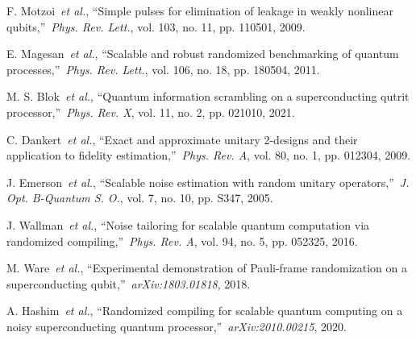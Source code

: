 \documentclass{ieeetran}
\begin{document}
\begin{thebibliography}{00}


 F. Motzoi~\emph{et al.}, ``Simple pulses for elimination of leakage in weakly nonlinear qubits,''~\emph{Phys. Rev. Lett.}, vol. 103, no. 11, pp. 110501, 2009.

 E. Magesan~\emph{et al.}, ``Scalable and robust randomized benchmarking of quantum processes,''~\emph{Phys. Rev. Lett.}, vol. 106, no. 18, pp. 180504, 2011.

 M. S. Blok~\emph{et al.}, ``Quantum information scrambling on a superconducting qutrit processor,''~\emph{Phys. Rev. X}, vol. 11, no. 2, pp. 021010, 2021.

 C. Dankert~\emph{et al.}, ``Exact and approximate unitary 2-designs and their application to fidelity estimation,''~\emph{Phys. Rev. A}, vol. 80, no. 1, pp. 012304, 2009.

 J. Emerson~\emph{et al.}, ``Scalable noise estimation with random unitary operators,''~\emph{J. Opt. B-Quantum S. O.}, vol. 7, no. 10, pp. S347, 2005.



 J. Wallman~\emph{et al.}, ``Noise tailoring for scalable quantum computation via randomized compiling,''~\emph{Phys. Rev. A}, vol. 94, no. 5, pp. 052325, 2016.

 M. Ware~\emph{et al.}, ``Experimental demonstration of Pauli-frame randomization on a superconducting qubit,''~\emph{arXiv:1803.01818}, 2018.

 A. Hashim~\emph{et al.}, ``Randomized compiling for scalable quantum computing on a noisy superconducting quantum processor,''~\emph{arXiv:2010.00215}, 2020.

\end{thebibliography}
\end{document}
